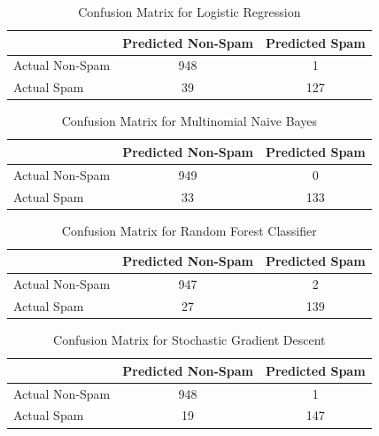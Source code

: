 \documentclass[12pt]{article}
\begin{document}
\begin{table}[!htbp]
\centering
\begin{tabular}{|l|c|c|}
\hline
           & Predicted Non-Spam & Predicted Spam \\ \hline
Actual Non-Spam & 948               & 1              \\ \hline
Actual Spam     & 39                & 127            \\ \hline
\end{tabular}
\caption{Confusion Matrix for Logistic Regression}
\label{tab:confusion_matrix_lr}
\end{table}

\begin{table}[!htbp]
\centering
\begin{tabular}{|l|c|c|}
\hline
           & Predicted Non-Spam & Predicted Spam \\ \hline
Actual Non-Spam & 949               & 0              \\ \hline
Actual Spam     & 33                & 133            \\ \hline
\end{tabular}
\caption{Confusion Matrix for Multinomial Naive Bayes}
\label{tab:confusion_matrix_nb}
\end{table}

\begin{table}[!htbp]
\centering
\begin{tabular}{|l|c|c|}
\hline
           & Predicted Non-Spam & Predicted Spam \\ \hline
Actual Non-Spam & 947               & 2              \\ \hline
Actual Spam     & 27                & 139            \\ \hline
\end{tabular}
\caption{Confusion Matrix for Random Forest Classifier}
\label{tab:confusion_matrix_rf}
\end{table}

\begin{table}[!htbp]
\centering
\begin{tabular}{|l|c|c|}
\hline
           & Predicted Non-Spam & Predicted Spam \\ \hline
Actual Non-Spam & 948               & 1              \\ \hline
Actual Spam     & 19                & 147            \\ \hline
\end{tabular}
\caption{Confusion Matrix for Stochastic Gradient Descent}
\label{tab:confusion_matrix_sg}
\end{table}
\end{document}

